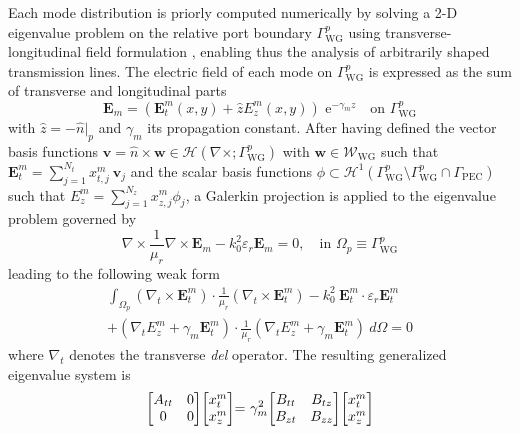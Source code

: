 \documentclass[journal,twoside,letterpaper]{IEEEtran}
\renewcommand{\vec}[1]{\mathbf{#1}}
\begin{document}
Each mode distribution is priorly computed numerically by solving a \mbox{2-D} eigenvalue problem on the relative port boundary $\Gamma_\text{WG}^{p}$ using transverse-longitudinal field formulation \cite{Jiao2008}, enabling thus the analysis of arbitrarily shaped transmission lines. The electric field of each mode on $\Gamma_\text{WG}^{p}$ is expressed as the sum of transverse and longitudinal parts
\begin{equation*}
\vec{E}_m = (\vec{E}_t^m(x,y) + \hat{z} E_z^m(x,y) ) \text{ e}^{-\gamma_m z} \quad \text{on } \Gamma_\text{WG}^{p}
\end{equation*}
\noindent with $\hat{z} = -\hat{n}|_{p}$ and $\gamma_m$ its propagation constant. After having defined the vector basis functions $\vec{v} = \hat{n}\times\vec{w} \in \mathcal{H}(\nabla \times;\Gamma_\text{WG}^{p})$ with $\vec{w} \in \mathcal{W}_\text{WG}$ such that $\vec{E}_t^m = \sum_{j=1}^{N_t} x_{t,j}^m \ \vec{v}_j$ and the scalar basis functions $\phi \subset \mathcal{H}^1(\Gamma_\text{WG}^{p} \setminus \Gamma_\text{WG}^p \cap \Gamma_\text{PEC} )$ such that $E_z^m = \sum_{j=1}^{N_z} x_{z,j}^m \phi_j$, a Galerkin projection is applied to the eigenvalue problem governed by
\begin{equation*}
\nabla \times \frac{1}{\mu_r} \nabla \times \vec{E}_m - {k}_0^2 {\varepsilon}_r \vec{E}_m = 0, \quad \text{in } \Omega_p \equiv  {\Gamma_\text{WG}^{p}}
\end{equation*}
%
\noindent leading to the following weak form
\begin{multline*}
\label{eq:fem2D}
\int_{\Omega_p} \left(\nabla_t \times \vec{E}_t^m \right) \cdot \frac{1}{\mu_r}\left(\nabla_t \times \vec{E}_t^m\right) - k_0^2 \  {\vec{E}_t^m}  \cdot \varepsilon_r \vec{E}_t^m \\
+ (\nabla_t E_z^m + \gamma_m \vec{E}_t^m )  \cdot \frac{1}{\mu_r}(\nabla_t E_z^m + \gamma_m \vec{E}_t^m) \ d\Omega = 0
\end{multline*}
\noindent where 
%
$\nabla_t$ denotes the transverse \textit{del} operator.
The resulting generalized eigenvalue system is
\begin{equation}
\label{eq:eigen}
\thickmuskip=0mu
\medmuskip=0mu
\thinmuskip=0mu
\begin{bmatrix}
{A}_{tt} &0\\
0 &0
\end{bmatrix}
\begin{bmatrix}
x_t^m\\
x_z^m
\end{bmatrix} = \ \gamma_m^2
\begin{bmatrix}
{B}_{tt} &{B}_{tz}\\
{B}_{zt} &{B}_{zz}
\end{bmatrix}
\begin{bmatrix}
x_t^m\\
x_z^m
\end{bmatrix}
\end{equation}
\end{document}
